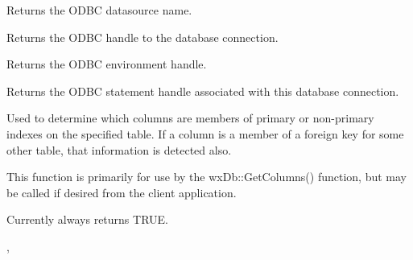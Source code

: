 \label{wxdbgetdatasource}


Returns the ODBC datasource name.

\label{wxdbgethdbc}


Returns the ODBC handle to the database connection.

\label{wxdbgethenv}


Returns the ODBC environment handle.

\label{wxdbgethstmt}


Returns the ODBC statement handle associated with this database connection.

\label{wxdbgetkeyfields}


Used to determine which columns are members of primary or non-primary indexes on the specified table.  If a column is a member of a foreign key for some other table, that information is detected also.

This function is primarily for use by the wxDb::GetColumns() function, but may be called if desired from the client application.




Currently always returns TRUE.


, 

\label{wxdbgetnext}


